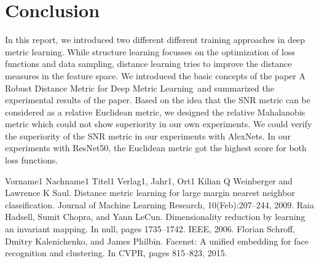 \documentclass[12pt,paper=a4]{scrartcl}
\theoremstyle{break}
\begin{document}
\section{Conclusion}
In this report, we introduced two different different training approaches in deep metric learning. While structure learning focusses on the optimization of loss functions and data sampling, distance learning tries to improve the distance measures in the feature space. We introduced the basic concepts of the paper \dq A Robust Distance Metric for Deep Metric Learning\dq \, and  summarized the experimental results of the paper. Based on the idea that the SNR metric can be considered as a relative Euclidean metric, we designed the relative Mahalanobis metric which could not show superiority in our own experiments. We could verify the superiority of the SNR metric in our experiments with AlexNets. In our experiments with ResNet50, the Euclidean metric got the highest score for both loss functions.
\begin{thebibliography}{9}

Vorname1 Nachname1
Titel1
Verlag1, Jahr1, Ort1
Kilian Q Weinberger and Lawrence K Saul. Distance metric
learning for large margin nearest neighbor classification.
Journal of Machine Learning Research, 10(Feb):207–244,
2009.
Raia Hadsell, Sumit Chopra, and Yann LeCun. Dimensionality
reduction by learning an invariant mapping. In null,
pages 1735–1742. IEEE, 2006.
Florian Schroff, Dmitry Kalenichenko, and James Philbin.
Facenet: A unified embedding for face recognition and clustering.
In CVPR, pages 815–823, 2015.



\end{thebibliography}
\end{document}
